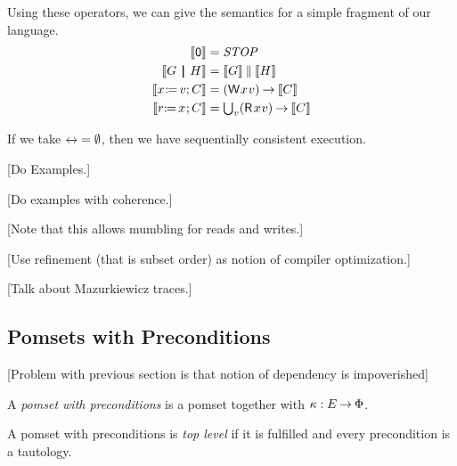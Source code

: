 Using these operators, we can give the semantics for a simple fragment of our
language.
\begin{align*}
  \sem{\NIL} &= \sSTOP
  \\
  \sem{\aGrp \PAR \bGrp} &= \sem{\aGrp}\sPAR\sem{\bGrp}
  \\
  \sem{\PW{\aLoc}{\aVal}\SEMI \aCmd} &= \textstyle\DWP{\aLoc}{\aVal}\sPREFIX\sem{\aCmd}
  \\
  \sem{\PR{\aLoc}{\aReg}\SEMI \aCmd} &= \textstyle\bigcup_{\aVal}\DRP{\aLoc}{\aVal}\sPREFIX\sem{\aCmd}
\end{align*}

If we take ${\mathrel\leftrightarrow} = \emptyset$, then we have sequentially consistent
execution.

[Do Examples.]

[Do examples with coherence.]

[Note that this allows mumbling for reads and writes.]

[Use refinement (that is subset order) as notion of compiler optimization.]

[Talk about Mazurkiewicz traces.]

\subsection{Pomsets with Preconditions}

[Problem with previous section is that  notion of dependency is impoverished]

\begin{definition}
  A \emph{pomset with preconditions} is
  a pomset together with $\kappa:E\mathbin\rightarrow\Phi$.
\end{definition}

\begin{definition}
  A pomset with preconditions is \emph{top level} if it is fulfilled and
  every precondition is a tautology.
\end{definition}

